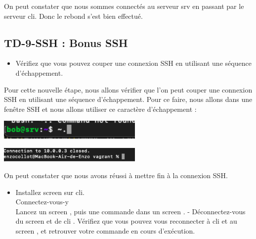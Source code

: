 \documentclass[12pt]{article}
\begin{document}
\vspace{0.3cm}

On peut constater que nous sommes connectés au serveur srv en passant par le serveur cli. Donc le rebond s'est bien effectué.

\newpage

\subsection{TD-9-SSH : Bonus SSH}

\vspace{0.3cm}

\begin{itemize}
  \item Vérifiez que vous pouvez couper une connexion SSH en utilisant une séquence d’échappement.
\end{itemize}

\vspace{0.3cm}

Pour cette nouvelle étape, nous allons vérifier que l'on peut couper une connexion SSH en utilisant une séquence d'échappement. Pour ce faire, nous allons dans une fenêtre SSH et nous allons utiliser ce caractère d'échappement :

\vspace{0.3cm}

\begin{center}
  \includegraphics[width=7cm]{Images-Client-SSH/Image-TD-SSH-9/echappement.png}
\end{center}

\vspace{0.3cm}

\begin{center}
  \includegraphics[width=7cm]{Images-Client-SSH/Image-TD-SSH-9/fin-de-conection.png}
\end{center}

\vspace{0.3cm}

On peut constater que nous avons réussi à mettre fin à la connexion SSH.

\vspace{0.3cm}

\begin{itemize}
  \item Installez screen sur cli. \\
  Connectez-vous-y \\
  Lancez un screen , puis une commande dans un screen . - Déconnectez-vous
  du screen et de cli . Vérifiez que vous pouvez vous reconnecter à cli et au
  screen , et retrouver votre commande en cours d’exécution.
\end{itemize}
\end{document}

